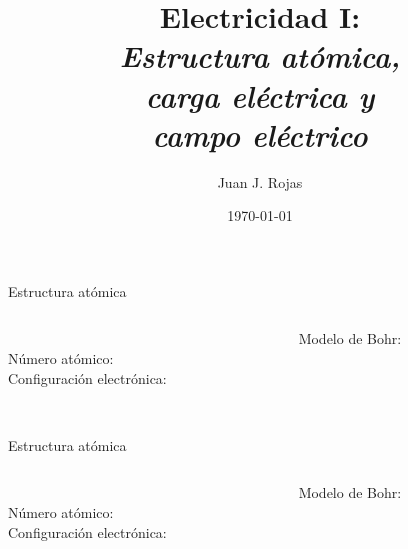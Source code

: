 \documentclass[aspectratio=169]{beamer}
\title{Electricidad I: \\ \emph{Estructura atómica,}\\ \emph{carga eléctrica y}\\ \emph{campo eléctrico}}
\author{
    Juan J. Rojas
}
\institute{Instituto Tecnológico de Costa Rica}
\date{\today}
\begin{document}

\maketitle

\begin{frame}{Estructura atómica}
    \begin{columns}[onlytextwidth]
    \begin{column}{0.6\textwidth}
        \textbf{}\\[8pt]
        Número atómico: \\[8pt]
        Configuración electrónica:\\[8pt] 
        \\[8pt]  
        \end{column}
    \begin{column}{0.4\textwidth}
    \begin{center}
        Modelo de Bohr:\\[8pt]
    \end{center}
\end{column}
\end{columns}
\end{frame}

\begin{frame}{Estructura atómica}
    \begin{columns}[onlytextwidth]
    \begin{column}{0.6\textwidth}
        \textbf{}\\[8pt]
        Número atómico: \\[8pt]
        Configuración electrónica:\\[8pt] 
        \\[8pt]  
        \end{column}
    \begin{column}{0.4\textwidth}
    \begin{center}
        Modelo de Bohr:\\[8pt]
    \end{center}
\end{column}
\end{columns}
\end{frame}
\end{document}
